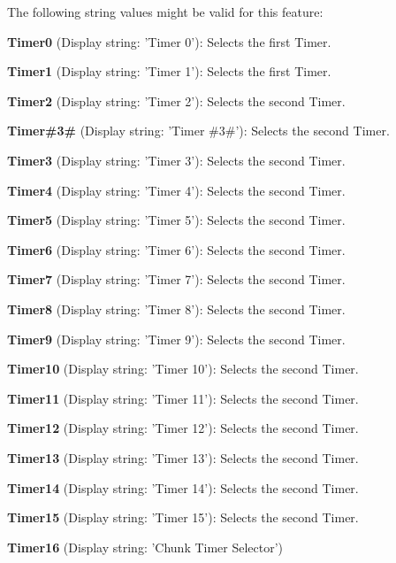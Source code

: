 The following string values might be valid for this feature\+:
\begin{DoxyItemize}
\item {\bfseries Timer0} (Display string\+: 'Timer 0')\+: Selects the first Timer.
\item {\bfseries Timer1} (Display string\+: 'Timer 1')\+: Selects the first Timer.
\item {\bfseries Timer2} (Display string\+: 'Timer 2')\+: Selects the second Timer.
\item {\bfseries Timer\#3\#} (Display string\+: 'Timer \#3\#')\+: Selects the second Timer.
\item {\bfseries Timer3} (Display string\+: 'Timer 3')\+: Selects the second Timer.
\item {\bfseries Timer4} (Display string\+: 'Timer 4')\+: Selects the second Timer.
\item {\bfseries Timer5} (Display string\+: 'Timer 5')\+: Selects the second Timer.
\item {\bfseries Timer6} (Display string\+: 'Timer 6')\+: Selects the second Timer.
\item {\bfseries Timer7} (Display string\+: 'Timer 7')\+: Selects the second Timer.
\item {\bfseries Timer8} (Display string\+: 'Timer 8')\+: Selects the second Timer.
\item {\bfseries Timer9} (Display string\+: 'Timer 9')\+: Selects the second Timer.
\item {\bfseries Timer10} (Display string\+: 'Timer 10')\+: Selects the second Timer.
\item {\bfseries Timer11} (Display string\+: 'Timer 11')\+: Selects the second Timer.
\item {\bfseries Timer12} (Display string\+: 'Timer 12')\+: Selects the second Timer.
\item {\bfseries Timer13} (Display string\+: 'Timer 13')\+: Selects the second Timer.
\item {\bfseries Timer14} (Display string\+: 'Timer 14')\+: Selects the second Timer.
\item {\bfseries Timer15} (Display string\+: 'Timer 15')\+: Selects the second Timer.
\item {\bfseries Timer16} (Display string\+: 'Chunk Timer Selector')
\end{DoxyItemize}

